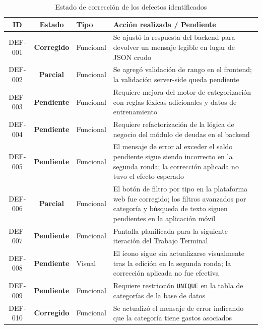 \begin{table}[H]
  \centering
  \small
  \caption{Estado de corrección de los defectos identificados}
  \label{tab:correcciones}
  \begin{tabular}{c c l p{7.5cm}}
    \toprule
    \textbf{ID} & \textbf{Estado} & \textbf{Tipo} & \textbf{Acción realizada / Pendiente} \\
    \midrule
    DEF-001 & \textcolor{OliveGreen}{\textbf{Corregido}} & Funcional &
      Se ajustó la respuesta del backend para devolver un mensaje legible en lugar de JSON crudo \\[4pt]
    DEF-002 & \textcolor{BurntOrange}{\textbf{Parcial}}  & Funcional &
      Se agregó validación de rango en el frontend; la validación server-side queda pendiente \\[4pt]
    DEF-003 & \textcolor{BrickRed}{\textbf{Pendiente}}   & Funcional &
      Requiere mejora del motor de categorización con reglas léxicas adicionales y datos de entrenamiento \\[4pt]
    DEF-004 & \textcolor{BrickRed}{\textbf{Pendiente}}   & Funcional &
      Requiere refactorización de la lógica de negocio del módulo de deudas en el backend \\[4pt]
    DEF-005 & \textcolor{BrickRed}{\textbf{Pendiente}}   & Funcional &
      El mensaje de error al exceder el saldo pendiente sigue siendo incorrecto en la segunda ronda; la corrección aplicada no tuvo el efecto esperado \\[4pt]
    DEF-006 & \textcolor{BurntOrange}{\textbf{Parcial}}  & Funcional &
      El botón de filtro por tipo en la plataforma web fue corregido; los filtros avanzados por categoría y búsqueda de texto siguen pendientes en la aplicación móvil \\[4pt]
    DEF-007 & \textcolor{BrickRed}{\textbf{Pendiente}}   & Funcional &
      Pantalla planificada para la siguiente iteración del Trabajo Terminal \\[4pt]
    DEF-008 & \textcolor{BrickRed}{\textbf{Pendiente}}   & Visual    &
      El ícono sigue sin actualizarse visualmente tras la edición en la segunda ronda; la corrección aplicada no fue efectiva \\[4pt]
    DEF-009 & \textcolor{BrickRed}{\textbf{Pendiente}}   & Funcional &
      Requiere restricción \texttt{UNIQUE} en la tabla de categorías de la base de datos \\[4pt]
    DEF-010 & \textcolor{OliveGreen}{\textbf{Corregido}} & Funcional &
      Se actualizó el mensaje de error indicando que la categoría tiene gastos asociados \\[4pt]

\end{tabular}
\end{table}
